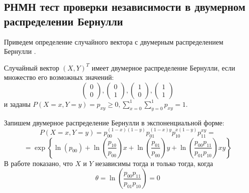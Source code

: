 \subsection{РНМН тест проверки независимости в двумерном
распределении Бернулли}\label{bivariate_umpu}
    

Приведем определение случайного вектора с 
двумерным распределением Бернулли \cite{Dai2013}.
\begin{definition}
    Случайный вектор $(X,Y)^T$ имеет двумерное распределение Бернулли,
    если множество его возможных значений:
    $$
        \begin{pmatrix}
            0 \\
            0
        \end{pmatrix},
        \begin{pmatrix}
            0 \\
            1
        \end{pmatrix},
        \begin{pmatrix}
            1 \\
            0
        \end{pmatrix},
        \begin{pmatrix}
            1 \\
            1
        \end{pmatrix}
    $$ и заданы $P(X=x,Y=y)=p_{xy} \geq 0,  \sum_{x=0}^1 \sum_{y=0}^1 p_{xy} =1$.
\end{definition}

Запишем двумерное распределение Бернулли в экспоненциальной форме:
$$
P(X=x,Y=y)=p_{00}^{(1-x)(1-y)}p_{01}^{(1-x)y}
p_{10}^{x(1-y)}p_{11}^{xy}=
$$
$$=\exp \left\{\ln(p_{00}) + 
     \ln \left(\dfrac{p_{10}}{p_{00}}\right) x
    +  \ln \left(\dfrac{p_{01}}{p_{00}}\right) y +
     \ln\left(\dfrac{p_{00}p_{11}}{p_{01}p_{10}}\right) xy
 \right\}
$$
В работе \cite{Dai2013} показано, что 
$X$ и $Y$ независимы тогда и только тогда, когда
$$\theta=\ln\left(\dfrac{p_{00}p_{11}}{p_{01}p_{10}}\right)=0$$

